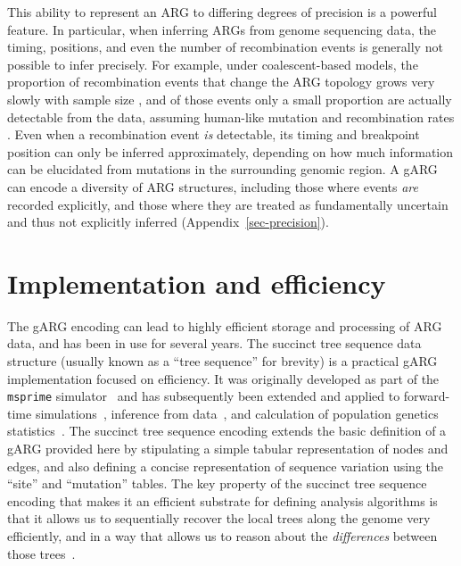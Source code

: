 \documentclass[9pt,twocolumn,twoside]{gsajnl}
\begin{document}
This ability to represent an ARG to differing degrees of precision is a powerful
feature. In particular, when inferring ARGs from genome
sequencing data, the timing, positions, and even the number of recombination
events is generally not possible to infer precisely. For example, under
coalescent-based models, the proportion of recombination events that change the
ARG topology grows very slowly with sample size \citep{hein2004gene}, and of those
events only a small proportion are actually detectable from the data, assuming
human-like mutation and recombination
rates \citep{myers2002detection,hayman2023recoverability}.
Even when a recombination event \emph{is} detectable, its timing and breakpoint
position can only be inferred approximately, depending on how much information
can be elucidated from mutations in the surrounding genomic region. 
A gARG can encode a diversity of ARG structures, including 
those where events \emph{are} recorded explicitly, and those where
they are treated as fundamentally uncertain and thus not explicitly inferred (Appendix~\ref{sec-precision}).


\section{Implementation and efficiency}
\label{sec-efficiency}
The gARG encoding can lead to highly efficient storage and processing of ARG data,
and has been in use for several years.
The succinct tree sequence data structure
(usually known as a ``tree sequence'' for brevity)
is a practical gARG implementation focused on efficiency.
It was originally developed as part of the \texttt{msprime}
simulator~\citep{kelleher2016efficient} and has subsequently been
extended and applied to forward-time
simulations~\citep{kelleher2018efficient,haller2018tree},
inference from
data~\citep{kelleher2019inferring,wohns2022unified,zhan2023towards},
and calculation of population genetics statistics~\citep{ralph2020efficiently}.
The succinct tree sequence encoding extends the basic definition
of a gARG provided here by stipulating a
simple tabular representation of nodes and edges,
and also defining a concise representation of
sequence variation using the ``site'' and  ``mutation'' tables.
The key property of the succinct tree sequence encoding
that makes it an efficient substrate for defining analysis
algorithms is that it allows us to sequentially
recover the local trees along the genome very efficiently,
and in a way that allows us to reason about the \emph{differences}
between those trees~\citep{kelleher2016efficient,ralph2020efficiently}.
\end{document}
